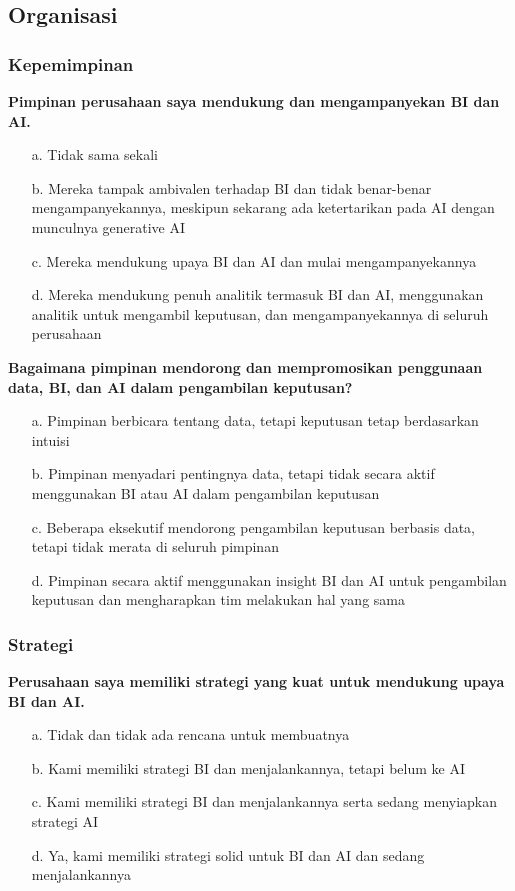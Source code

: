 \documentclass{article}
\begin{document}
\subsection{Organisasi}

\subsubsection{Kepemimpinan}

\textbf{Pimpinan perusahaan saya mendukung dan mengampanyekan BI dan AI.}

\begin{enumerate}
	\item[a.] Tidak sama sekali
	\item[b.] Mereka tampak ambivalen terhadap BI dan tidak benar-benar mengampanyekannya, meskipun sekarang ada ketertarikan pada AI dengan munculnya generative AI
	\item[c.] Mereka mendukung upaya BI dan AI dan mulai mengampanyekannya
	\item[d.] Mereka mendukung penuh analitik termasuk BI dan AI, menggunakan analitik untuk mengambil keputusan, dan mengampanyekannya di seluruh perusahaan
\end{enumerate}

\textbf{Bagaimana pimpinan mendorong dan mempromosikan penggunaan data, BI, dan AI dalam pengambilan keputusan?}

\begin{enumerate}
	\item[a.] Pimpinan berbicara tentang data, tetapi keputusan tetap berdasarkan intuisi
	\item[b.] Pimpinan menyadari pentingnya data, tetapi tidak secara aktif menggunakan BI atau AI dalam pengambilan keputusan
	\item[c.] Beberapa eksekutif mendorong pengambilan keputusan berbasis data, tetapi tidak merata di seluruh pimpinan
	\item[d.] Pimpinan secara aktif menggunakan insight BI dan AI untuk pengambilan keputusan dan mengharapkan tim melakukan hal yang sama
\end{enumerate}

\subsubsection{Strategi}

\textbf{Perusahaan saya memiliki strategi yang kuat untuk mendukung upaya BI dan AI.}

\begin{enumerate}
	\item[a.] Tidak dan tidak ada rencana untuk membuatnya
	\item[b.] Kami memiliki strategi BI dan menjalankannya, tetapi belum ke AI
	\item[c.] Kami memiliki strategi BI dan menjalankannya serta sedang menyiapkan strategi AI
	\item[d.] Ya, kami memiliki strategi solid untuk BI dan AI dan sedang menjalankannya
\end{enumerate}
\end{document}
